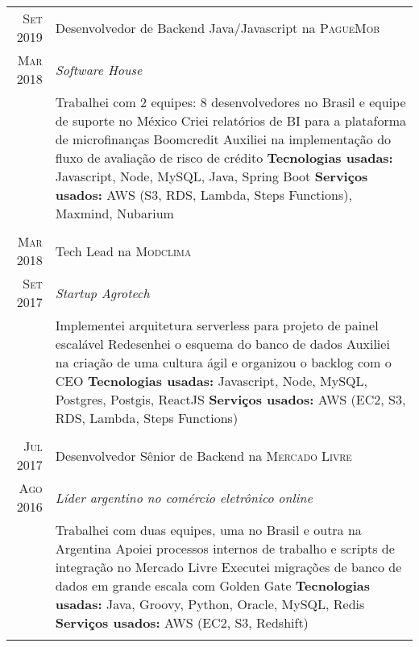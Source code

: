 \documentclass[a4paper,10pt]{article}
\begin{document}
\begin{tabular}{r|p{11cm}}
 \textsc{ Set 2019 } & Desenvolvedor de Backend Java/Javascript na \textsc{PagueMob} \\\textsc{Mar 2018}&\emph{Software House }\\&\footnotesize{
  Trabalhei com 2 equipes: 8 desenvolvedores no Brasil e equipe de suporte no México \newline
  Criei relatórios de BI para a plataforma de microfinanças Boomcredit \newline
  Auxiliei na implementação do fluxo de avaliação de risco de crédito \newline
\textbf{Tecnologias usadas:} Javascript, Node, MySQL, Java, Spring Boot\newline
\textbf{Serviços usados:} AWS (S3, RDS, Lambda, Steps Functions), Maxmind, Nubarium }\\\multicolumn{2}{c}{} \\

 \textsc{ Mar 2018 } & Tech Lead na \textsc{Modclima} \\\textsc{Set 2017}&\emph{Startup Agrotech }\\&\footnotesize{
  Implementei arquitetura serverless para projeto de painel escalável\newline
  Redesenhei o esquema do banco de dados\newline
  Auxiliei na criação de uma cultura ágil e organizou o backlog com o CEO\newline
\textbf{Tecnologias usadas:} Javascript, Node, MySQL, Postgres, Postgis, ReactJS\newline
\textbf{Serviços usados:} AWS (EC2, S3, RDS, Lambda, Steps Functions)}\\\multicolumn{2}{c}{} \\

 \textsc{Jul 2017} & Desenvolvedor Sênior de Backend na \textsc{Mercado Livre} \\\textsc{Ago 2016}&\emph{Líder argentino no comércio eletrônico online }\\&\footnotesize{
  Trabalhei com duas equipes, uma no Brasil e outra na Argentina\newline
  Apoiei processos internos de trabalho e scripts de integração no Mercado Livre\newline
  Executei migrações de banco de dados em grande escala com Golden Gate\newline
\textbf{Tecnologias usadas:} Java, Groovy, Python, Oracle, MySQL, Redis\newline
\textbf{Serviços usados:} AWS (EC2, S3, Redshift)}\\\multicolumn{2}{c}{} \\


 
 \end{tabular}
 
\end{document}
